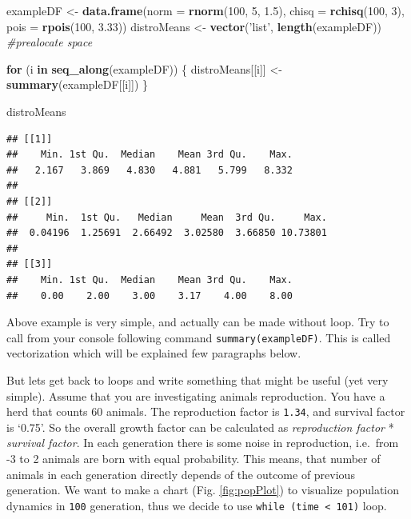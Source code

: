 \documentclass[]{book}
\newenvironment{Shaded}{\begin{snugshade}}{\end{snugshade}}
\newcommand{\KeywordTok}[1]{\textcolor[rgb]{0.13,0.29,0.53}{\textbf{#1}}}
\newcommand{\DataTypeTok}[1]{\textcolor[rgb]{0.13,0.29,0.53}{#1}}
\newcommand{\DecValTok}[1]{\textcolor[rgb]{0.00,0.00,0.81}{#1}}
\newcommand{\FloatTok}[1]{\textcolor[rgb]{0.00,0.00,0.81}{#1}}
\newcommand{\StringTok}[1]{\textcolor[rgb]{0.31,0.60,0.02}{#1}}
\newcommand{\CommentTok}[1]{\textcolor[rgb]{0.56,0.35,0.01}{\textit{#1}}}
\newcommand{\ControlFlowTok}[1]{\textcolor[rgb]{0.13,0.29,0.53}{\textbf{#1}}}
\newcommand{\NormalTok}[1]{#1}
\theoremstyle{definition}
\theoremstyle{definition}
\theoremstyle{definition}
\theoremstyle{remark}
\begin{document}
\begin{Shaded}
\begin{Highlighting}[]
\NormalTok{exampleDF <-}\StringTok{ }\KeywordTok{data.frame}\NormalTok{(}\DataTypeTok{norm =} \KeywordTok{rnorm}\NormalTok{(}\DecValTok{100}\NormalTok{, }\DecValTok{5}\NormalTok{, }\FloatTok{1.5}\NormalTok{),}
                        \DataTypeTok{chisq =} \KeywordTok{rchisq}\NormalTok{(}\DecValTok{100}\NormalTok{, }\DecValTok{3}\NormalTok{),}
                        \DataTypeTok{pois =} \KeywordTok{rpois}\NormalTok{(}\DecValTok{100}\NormalTok{, }\FloatTok{3.33}\NormalTok{))}
\NormalTok{distroMeans <-}\StringTok{ }\KeywordTok{vector}\NormalTok{(}\StringTok{'list'}\NormalTok{, }\KeywordTok{length}\NormalTok{(exampleDF)) }\CommentTok{#prealocate space}

\ControlFlowTok{for}\NormalTok{ (i }\ControlFlowTok{in} \KeywordTok{seq_along}\NormalTok{(exampleDF)) \{}
\NormalTok{  distroMeans[[i]] <-}\StringTok{ }\KeywordTok{summary}\NormalTok{(exampleDF[[i]])}
\NormalTok{\}}

\NormalTok{distroMeans}
\end{Highlighting}
\end{Shaded}

\begin{verbatim}
## [[1]]
##    Min. 1st Qu.  Median    Mean 3rd Qu.    Max. 
##   2.167   3.869   4.830   4.881   5.799   8.332 
## 
## [[2]]
##     Min.  1st Qu.   Median     Mean  3rd Qu.     Max. 
##  0.04196  1.25691  2.66492  3.02580  3.66850 10.73801 
## 
## [[3]]
##    Min. 1st Qu.  Median    Mean 3rd Qu.    Max. 
##    0.00    2.00    3.00    3.17    4.00    8.00
\end{verbatim}

Above example is very simple, and actually can be made without loop. Try
to call from your console following command \texttt{summary(exampleDF)}.
This is called vectorization which will be explained few paragraphs
below.

But lets get back to loops and write something that might be useful (yet
very simple). Assume that you are investigating animals reproduction.
You have a herd that counts 60 animals. The reproduction factor is
\texttt{1.34}, and survival factor is `0.75'. So the overall growth
factor can be calculated as \emph{reproduction factor} * \emph{survival
factor}. In each generation there is some noise in reproduction,
i.e.~from -3 to 2 animals are born with equal probability. This means,
that number of animals in each generation directly depends of the
outcome of previous generation. We want to make a chart (Fig.
\ref{fig:popPlot}) to visualize population dynamics in \texttt{100}
generation, thus we decide to use
\texttt{while\ (time\ \textless{}\ 101)} loop.
\end{document}
